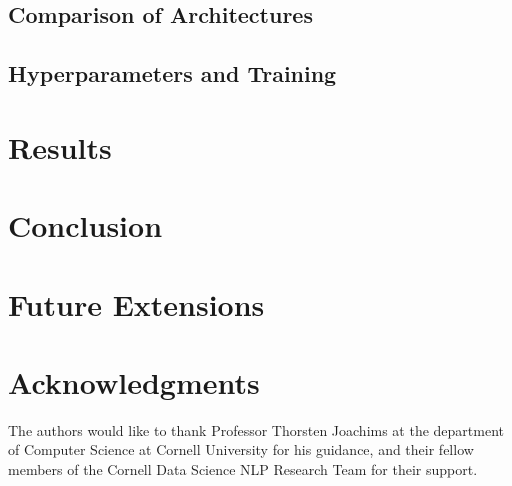\documentclass{vldb}
\begin{document}
\subsection{Comparison of Architectures}

\subsection{Hyperparameters and Training}

\section{Results}

\section{Conclusion}

\section{Future Extensions}

\section{Acknowledgments}
The authors would like to thank Professor Thorsten Joachims at the department of Computer Science at Cornell University for his guidance, and their fellow members of the Cornell Data Science NLP Research Team for their support.


  



\begin{appendix}

\end{appendix}
\end{document}
